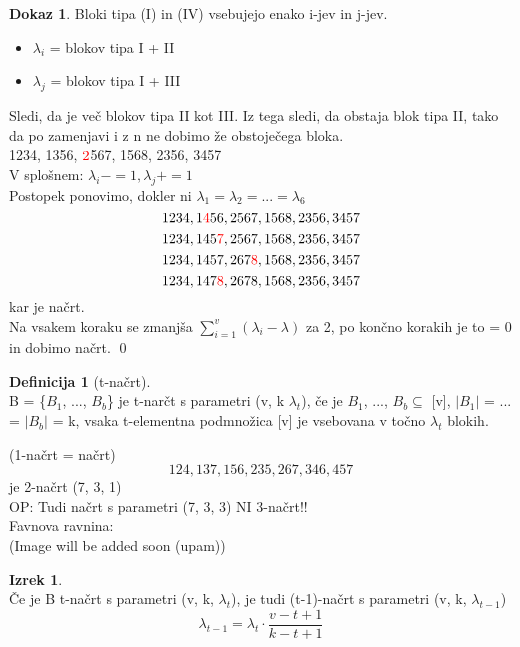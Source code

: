 \documentclass[a4paper,12pt]{article}
\theoremstyle{definition}
\newtheorem{defn}[counter]{Definicija}
\newtheorem{theorem}[counter]{Izrek}
\newtheorem{pro}[counter]{Dokaz}
\theoremstyle{remark}
\begin{document}
\begin{pro}
Bloki tipa (I) in (IV) vsebujejo enako i-jev in j-jev.
\begin{itemize}
    \item[] $\lambda_i$ = blokov tipa I + II
    \item[] $\lambda_j$ = blokov tipa I + III
\end{itemize}
Sledi, da je več blokov tipa II kot III. Iz tega sledi, da obstaja blok tipa II, tako da po zamenjavi i z n ne dobimo že obstoječega bloka.\\
1234, 1356, $\textcolor{red}{2}$567, 1568, 2356, 3457\\
V splošnem: $\lambda_i -= 1, \lambda_j += 1$\\
Postopek ponovimo, dokler ni $\lambda_1 = \lambda_2 = ... = \lambda_6$
\[1234, 1\textcolor{red}{4}56, 2567, 1568, 2356, 3457\]
\[1234, 145\textcolor{red}{7}, 2567, 1568, 2356, 3457\]
\[1234, 1457, 267\textcolor{red}{8}, 1568, 2356, 3457\]
\[1234, 147\textcolor{red}{8}, 2678, 1568, 2356, 3457\]
kar je načrt.\\
Na vsakem koraku se zmanjša $\displaystyle \sum_{i = 1}^v (\lambda_i - \lambda)$ za 2, po končno korakih je to = 0 in dobimo načrt.
\qed
\end{pro}

\begin{defn}[t-načrt]\mbox{}\\
B = \{$B_1$, ..., $B_b$\} je t-narčt s parametri (v, k $\lambda_t$), če je $B_1$, ..., $B_b \subseteq$ [v], $|B_1|$ = ... = $|B_b|$ = k, vsaka t-elementna podmnožica [v] je vsebovana v točno $\lambda_t$ blokih.
\end{defn}
(1-načrt = načrt)
\[124, 137, 156, 235, 267, 346, 457\]
je 2-načrt (7, 3, 1)\\
OP: Tudi načrt s parametri (7, 3, 3) NI 3-načrt!!\\

Favnova ravnina:\\
(Image will be added soon (upam))


\begin{theorem}\mbox{}\\
Če je B t-načrt s parametri (v, k, $\lambda_t$), je tudi (t-1)-načrt s parametri (v, k, $\lambda_{t-1}$)
\[\lambda_{t-1} = \lambda_t \cdot \frac{v - t + 1}{k - t + 1}\]
\end{theorem}
\end{document}
